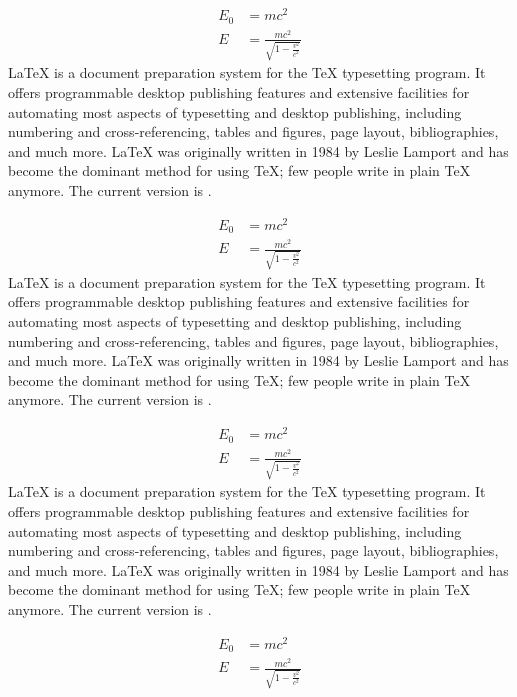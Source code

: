 \documentclass[twoside]{article}
\begin{document}
  \begin{align}
    E_0 &= mc^2                              \\
    E &= \frac{mc^2}{\sqrt{1-\frac{v^2}{c^2}}}
  \end{align}
  \LaTeX{} is a document preparation system for the \TeX{}
  typesetting program. It offers programmable desktop
  publishing features and extensive facilities for
  automating most aspects of typesetting and desktop
  publishing, including numbering and cross-referencing,
  tables and figures, page layout, bibliographies, and
  much more. \LaTeX{} was originally written in 1984 by
  Leslie Lamport and has become the dominant method for
  using \TeX; few people write in plain \TeX{} anymore.
  The current version is \LaTeXe.

  \begin{align}
    E_0 &= mc^2                              \\
    E &= \frac{mc^2}{\sqrt{1-\frac{v^2}{c^2}}}
  \end{align}
  \LaTeX{} is a document preparation system for the \TeX{}
  typesetting program. It offers programmable desktop
  publishing features and extensive facilities for
  automating most aspects of typesetting and desktop
  publishing, including numbering and cross-referencing,
  tables and figures, page layout, bibliographies, and
  much more. \LaTeX{} was originally written in 1984 by
  Leslie Lamport and has become the dominant method for
  using \TeX; few people write in plain \TeX{} anymore.
  The current version is \LaTeXe.

  \begin{align}
    E_0 &= mc^2                              \\
    E &= \frac{mc^2}{\sqrt{1-\frac{v^2}{c^2}}}
  \end{align}
  \LaTeX{} is a document preparation system for the \TeX{}
  typesetting program. It offers programmable desktop
  publishing features and extensive facilities for
  automating most aspects of typesetting and desktop
  publishing, including numbering and cross-referencing,
  tables and figures, page layout, bibliographies, and
  much more. \LaTeX{} was originally written in 1984 by
  Leslie Lamport and has become the dominant method for
  using \TeX; few people write in plain \TeX{} anymore.
  The current version is \LaTeXe.

  \begin{align}
    E_0 &= mc^2                              \\
    E &= \frac{mc^2}{\sqrt{1-\frac{v^2}{c^2}}}
  \end{align}
\end{document}
